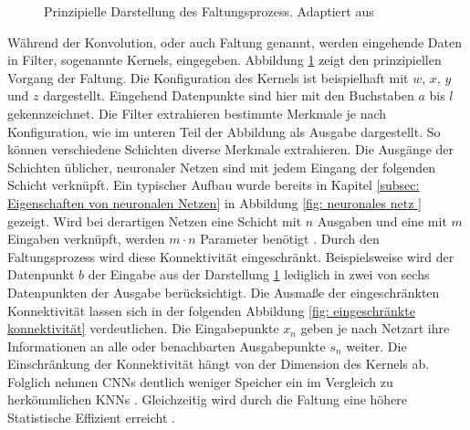 \begin{figure}[H]
			\caption{Prinzipielle Darstellung des Faltungsprozess. Adaptiert aus \cite{deeplearning}}
			\label{fig: faltung }
		\end{figure}
		
		Während der Konvolution, oder auch Faltung genannt, werden eingehende Daten in Filter, sogenannte Kernels, eingegeben. Abbildung \ref{fig: faltung } zeigt den prinzipiellen Vorgang der Faltung. Die Konfiguration des Kernels ist beispielhaft mit $w$, $x$, $y$ und $z$ dargestellt. Eingehend Datenpunkte sind hier mit den Buchstaben $a$ bis $l$ gekennzeichnet. Die Filter extrahieren bestimmte Merkmale je nach Konfiguration, wie im unteren Teil der Abbildung als Ausgabe dargestellt. So können verschiedene Schichten diverse Merkmale extrahieren. Die Ausgänge der Schichten üblicher, neuronaler Netzen sind mit jedem Eingang der folgenden Schicht verknüpft. Ein typischer Aufbau wurde bereits in Kapitel \ref{subsec: Eigenschaften von neuronalen Netzen} in Abbildung \ref{fig: neuronales netz } gezeigt. Wird bei derartigen Netzen eine Schicht mit $n$ Ausgaben und eine mit $m$ Eingaben verknüpft, werden $m \cdot n$ Parameter benötigt \cite{deeplearning}. Durch den Faltungsprozess wird diese Konnektivität eingeschränkt. Beispielsweise wird der Datenpunkt $b$ der Eingabe aus der Darstellung \ref{fig: faltung } lediglich in zwei von sechs Datenpunkten der Ausgabe berücksichtigt. Die Ausmaße der eingeschränkten Konnektivität lassen sich in der folgenden Abbildung \ref{fig: eingeschränkte konnektivität} verdeutlichen. Die Eingabepunkte $x_n$ geben je nach Netzart ihre Informationen an alle oder benachbarten Ausgabepunkte $s_n$ weiter. Die Einschränkung der Konnektivität hängt von der Dimension des Kernels ab. Folglich nehmen CNNs deutlich weniger Speicher ein im Vergleich zu herkömmlichen KNNs \cite{deeplearning}. Gleichzeitig wird durch die Faltung eine höhere Statistische Effizient erreicht \cite{deeplearning}.\\
		
